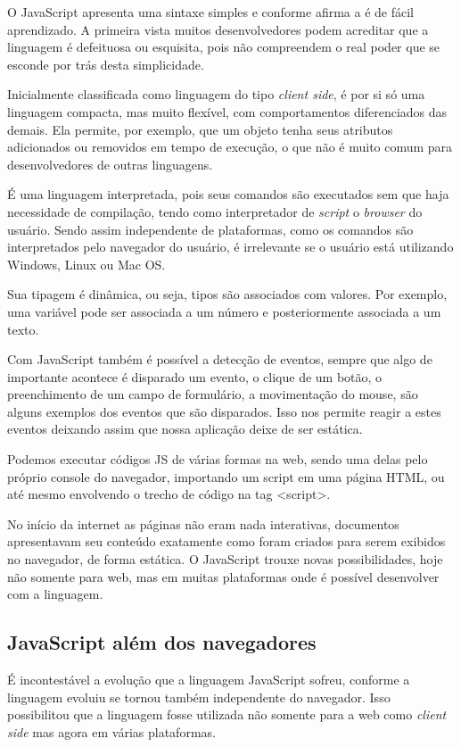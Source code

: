 \documentclass[
	12pt,				%
	openright,			%
	twoside,			%
	a4paper,			%
	english,			%
	brazil				%
	]{abntex2}
\begin{document}
O JavaScript apresenta uma sintaxe simples e conforme afirma a \citeauthor{w3schools_javascript} é de fácil aprendizado. A primeira vista muitos desenvolvedores podem acreditar que a linguagem é defeituosa ou esquisita, pois não compreendem o real poder que se esconde por trás desta simplicidade.

Inicialmente classificada como linguagem do tipo \textit{client side}, é por si só uma linguagem compacta, mas muito flexível, com comportamentos diferenciados das demais. Ela permite, por exemplo, que um objeto tenha seus atributos adicionados ou removidos em tempo de execução, o que não é muito comum para desenvolvedores de outras linguagens.

É uma linguagem interpretada, pois seus comandos são executados sem que haja necessidade de compilação, tendo como interpretador de \textit{script} o \textit{browser} do usuário. Sendo assim independente de plataformas, como os comandos são interpretados pelo navegador do usuário, é irrelevante se o usuário está utilizando Windows, Linux ou Mac OS.

Sua tipagem é dinâmica, ou seja, tipos são associados com valores. Por exemplo, uma variável pode ser associada a um número e posteriormente associada a um texto.

Com JavaScript também é possível a detecção de eventos, sempre que algo de importante acontece é disparado um evento, o clique de um botão, o preenchimento de um campo de formulário, a movimentação do mouse, são alguns exemplos dos eventos que são disparados. Isso nos permite reagir a estes eventos deixando assim que nossa aplicação deixe de ser estática.

Podemos executar códigos JS de várias formas na web, sendo uma delas pelo próprio console do navegador, importando um script em uma página HTML, ou até mesmo envolvendo o trecho de código na tag <script>.

No início da internet as páginas não eram nada interativas, documentos apresentavam seu conteúdo exatamente como foram criados para serem exibidos no navegador, de forma estática. O JavaScript trouxe novas possibilidades, hoje não somente para web, mas em muitas plataformas onde é possível desenvolver com a linguagem. 

\subsection{JavaScript além dos navegadores}

É incontestável a evolução que a linguagem JavaScript sofreu, conforme a linguagem evoluiu se tornou também independente do navegador. Isso possibilitou que a linguagem fosse utilizada não somente para a web como \textit{client side} mas agora em várias plataformas. 
\end{document}
